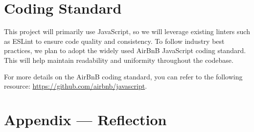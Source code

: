 \documentclass{article}
\begin{document}
\section{Coding Standard}

This project will primarily use JavaScript, so we will leverage existing linters such as ESLint to ensure code quality and consistency. To follow industry best practices, we plan to adopt the widely used AirBnB JavaScript coding standard. This will help maintain readability and uniformity throughout the codebase.

For more details on the AirBnB coding standard, you can refer to the following resource: \url{https://github.com/airbnb/javascript}.

\section*{Appendix --- Reflection}



\end{document}
